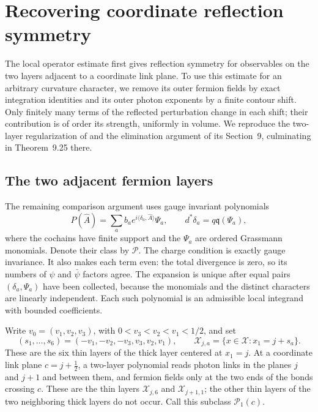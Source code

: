 \section{Recovering coordinate reflection symmetry}\label{sec:coordinate-symmetry}

The local operator estimate first gives reflection symmetry for
observables on the two layers adjacent to a coordinate link plane.
To use this estimate for an arbitrary curvature character, we remove
its outer fermion fields by exact integration identities and its
outer photon exponents by a finite contour shift. Only finitely many
terms of the reflected perturbation change in each shift; their
contribution is of order its strength, uniformly in volume. We reproduce
the two-layer regularization of \cite[Sections~8.9--8.10]{ChamberQED}
and the elimination argument of its Section~9, culminating in
Theorem~9.25 there.

\subsection{The two adjacent fermion layers}\label{subsec:diag-two-layers}

The remaining comparison argument uses gauge invariant polynomials
\[
 P(\widehat A)=\sum_a b_a e^{i\langle\delta_a,\widehat A\rangle}
                                     \Psi_a,\qquad
 d^*\delta_a=q\mathfrak q(\Psi_a),
\]
where the cochains have finite support and the $\Psi_a$ are ordered
Grassmann monomials. Denote their class by $\mathcal P$. The charge
condition is exactly gauge invariance. It also makes each term
even: the total divergence is zero, so its numbers of $\psi$ and
$\bar\psi$ factors agree. The expansion is unique after equal
pairs $(\delta_a,\Psi_a)$ have been collected, because the monomials
and the distinct characters are linearly independent. Each such
polynomial is an admissible local integrand with bounded coefficients.

Write $v_0=(v_1,v_2,v_3)$, with $0<v_3<v_2<v_1<1/2$, and set
\[
 (s_1,\ldots,s_6)=(-v_1,-v_2,-v_3,v_3,v_2,v_1),\qquad
 \mathcal X_{j,a}=\{x\in\mathcal X:x_1=j+s_a\}.
\]
These are the six thin layers of the thick layer centered at $x_1=j$.
At a coordinate link plane $c=j+\tfrac12$, a two-layer polynomial
reads photon links in the planes $j$ and $j+1$ and between them,
and fermion fields only at the two ends of the bonds crossing
$c$. These are the thin layers $\mathcal X_{j,6}$ and
$\mathcal X_{j+1,1}$; the other thin layers of the two neighboring thick layers do
not occur. Call this subclass $\mathcal P_1(c)$.

